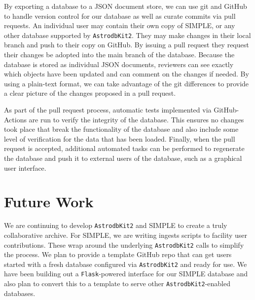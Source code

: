 \documentclass[11pt,twoside]{article}
\begin{document}
By exporting a database to a JSON document store, we can use git and GitHub to handle version control for our database as well as curate commits via pull requests. 
An individual user may contain their own copy of SIMPLE, or any other database supported by \texttt{AstrodbKit2}. They may make changes in their local branch and push to their copy on GitHub. By issuing a pull request they request their changes be adopted into the main branch of the database. Because the database is stored as individual JSON documents, reviewers can see exactly which objects have been updated and can comment on the changes if needed. 
By using a plain-text format, we can take advantage of the git differences to provide a clear picture of the changes proposed in a pull request. 

As part of the pull request process, automatic tests implemented via GitHub-Actions are run to verify the integrity of the database. This ensures no changes took place that break the functionality of the database and also include some level of verification for the data that has been loaded. 
Finally, when the pull request is accepted, additional automated tasks can be performed to regenerate the database and push it to external users of the database, such as a graphical user interface.

\section{Future Work}

We are continuing to develop \texttt{AstrodbKit2} and SIMPLE to create a truly collaborative archive. 
For SIMPLE, we are writing ingests scripts to facility user contributions. These wrap around the underlying \texttt{AstrodbKit2} calls to simplify the process.
We plan to provide a template GitHub repo that can get users started with a fresh database configured via \texttt{AstrodbKit2} and ready for use. 
We have been building out a \texttt{Flask}-powered interface for our SIMPLE database and also plan to convert this to a template to serve other \texttt{AstrodbKit2}-enabled databases.
\end{document}
